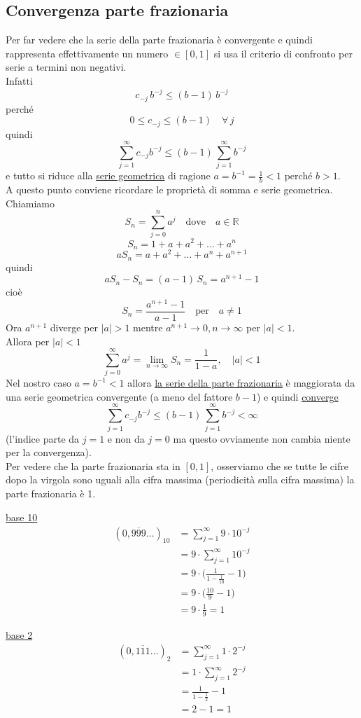 \subsection{Convergenza parte frazionaria}
Per far vedere che la serie della parte frazionaria è convergente e quindi rappresenta effettivamente un numero $\in [0,1]$ si usa il criterio di confronto per serie a termini non negativi. \\
Infatti \[ c_{-j}\,b^{-j} \le (b-1)\,b^{-j} \]
perché \[ 0 \le c_{-j} \le (b-1) \quad \forall \, j \]
quindi \[ \sum_{j=1}^{\infty}c_{-j}b^{-j} \le (b-1)\,\sum_{j=1}^{\infty}b^{-j} \]
e tutto si riduce alla \uline{serie geometrica} di ragione $a = b^{-1} = \frac{1}{b} < 1$ perché $b > 1$.\\
A questo punto conviene ricordare le proprietà di somma e serie geometrica. 
Chiamiamo \[ S_n = \sum_{j=0}^{n}a^j \quad \text{dove} \quad a \in \mathbb{R} \]
\[ S_n = 1 + a + a^2 + \dotsc + a^n \]
\[ aS_n = a + a^2 + \dotsc + a^n + a^{n+1} \]
quindi \[ aS_n - S_n = (a - 1)\,S_n = a^{n+1} -1 \]
cioè \[ S_n = \frac{a^{n+1} - 1}{a - 1} \quad \text{per} \quad a \ne 1 \]
Ora $a^{n+1}$ diverge per $\lvert a\rvert > 1$ mentre $a^{n+1} \longrightarrow 0 , n \to \infty $ per $\lvert a\rvert < 1$.\\
Allora per $\lvert a\rvert < 1$
\[ \sum_{j=0}^{\infty}a^j = \lim_{n \to \infty} S_n = \frac{1}{1 - a} , \quad \lvert a\rvert < 1 \]
Nel nostro caso $a = b^{-1} < 1$ allora \uline{la serie della parte frazionaria} è maggiorata da una serie geometrica convergente (a meno del fattore $b-1$) e quindi \uline{converge}
\[ \sum_{j=1}^{\infty}c_{-j}b^{-j} \le (b-1)\,\sum_{j=1}^{\infty}b^{-j} < \infty \]
(l'indice parte da $j = 1$ e non da $j = 0$ ma questo ovviamente non cambia niente per la convergenza). \\
Per vedere che la parte frazionaria sta in $[0,1]$, osserviamo che se tutte le cifre dopo la virgola sono uguali alla cifra massima (periodicità sulla cifra massima) la parte frazionaria è 1.

\begin{esempio}
\uline{base 10}
\[ \begin{split}
    (0,\overline{999} \dotsc)_{10} & = \sum_{j=1}^{\infty} 9 \cdot 10^{-j} \\
    & = 9 \cdot \sum_{j=1}^{\infty} 10^{-j} \\
    & = 9 \cdot \biggl( \frac{1}{1 - \frac{1}{10}} - 1 \biggr) \\
    & = 9 \cdot \biggl( \frac{10}{9} - 1 \biggr) \\
    & = 9 \cdot \frac{1}{9} = 1
\end{split} \]
\end{esempio}
\begin{esempio}
\uline{base 2}
\[ \begin{split}
    (0,\overline{111} \dotsc)_{2} & = \sum_{j=1}^{\infty} 1 \cdot 2^{-j} \\
    & = 1 \cdot \sum_{j=1}^{\infty} 2^{-j} \\
    & = \frac{1}{1 - \frac{1}{2}} - 1 \\
    & = 2 - 1 = 1
\end{split} \]
\end{esempio}

